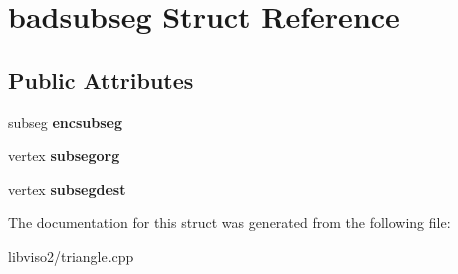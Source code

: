 \hypertarget{structbadsubseg}{\section{badsubseg Struct Reference}
\label{structbadsubseg}
}
\subsection*{Public Attributes}
\begin{DoxyCompactItemize}
\item 
\hypertarget{structbadsubseg_ad48ae5d8b70757545ba8f6fe33143b64}{subseg {\bfseries encsubseg}}\label{structbadsubseg_ad48ae5d8b70757545ba8f6fe33143b64}

\item 
\hypertarget{structbadsubseg_ac06bcfaa89508ea06c7f4c003c74d463}{vertex {\bfseries subsegorg}}\label{structbadsubseg_ac06bcfaa89508ea06c7f4c003c74d463}

\item 
\hypertarget{structbadsubseg_a8ca4f27968ded45a43c39be9b7e40770}{vertex {\bfseries subsegdest}}\label{structbadsubseg_a8ca4f27968ded45a43c39be9b7e40770}

\end{DoxyCompactItemize}


The documentation for this struct was generated from the following file\+:\begin{DoxyCompactItemize}
\item 
libviso2/triangle.\+cpp\end{DoxyCompactItemize}
